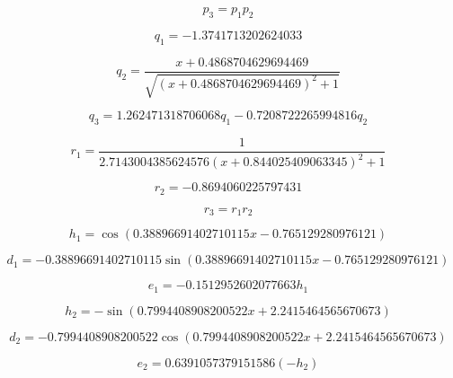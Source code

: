 \begin{equation}
p_{3}=p_{1} p_{2}
\end{equation}


\begin{equation}
q_{1}=-1.3741713202624033
\end{equation}


\begin{equation}
q_{2}=\frac{x + 0.4868704629694469}{\sqrt{\left(x + 0.4868704629694469\right)^{2} + 1}}
\end{equation}


\begin{equation}
q_{3}=1.262471318706068 q_{1} - 0.7208722265994816 q_{2}
\end{equation}


\begin{equation}
r_{1}=\frac{1}{2.7143004385624576 \left(x + 0.844025409063345\right)^{2} + 1}
\end{equation}


\begin{equation}
r_{2}=-0.8694060225797431
\end{equation}


\begin{equation}
r_{3}=r_{1} r_{2}
\end{equation}


\begin{equation}
h_{1}=\cos{\left(0.38896691402710115 x - 0.765129280976121 \right)}
\end{equation}


\begin{equation}
d_{1}=- 0.38896691402710115 \sin{\left(0.38896691402710115 x - 0.765129280976121 \right)}
\end{equation}


\begin{equation}
e_{1}=- 0.1512952602077663 h_{1}
\end{equation}


\begin{equation}
h_{2}=- \sin{\left(0.7994408908200522 x + 2.2415464565670673 \right)}
\end{equation}


\begin{equation}
d_{2}=- 0.7994408908200522 \cos{\left(0.7994408908200522 x + 2.2415464565670673 \right)}
\end{equation}


\begin{equation}
e_{2}=0.6391057379151586 (-h_{2})
\end{equation}


